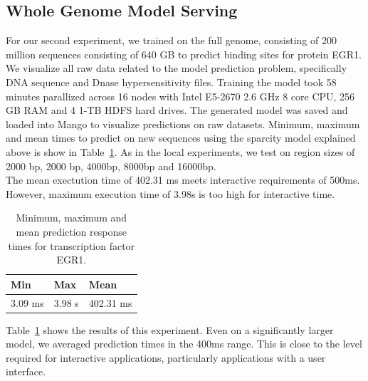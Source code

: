 \documentclass{sig-alternate-05-2015}
\begin{document}
\subsection{Whole Genome Model Serving}
For our second experiment, we trained on the full genome, consisting of 200 million sequences consisting of 640 GB to predict binding sites for protein EGR1. We visualize all raw data related to the model prediction problem, specifically DNA sequence and Dnase hypersensitivity files. Training the model took 58 minutes parallized across 16 nodes with Intel E5-2670 2.6 GHz 8 core CPU, 256 GB RAM and 4 1-TB HDFS hard drives. The generated model was saved and loaded into Mango to visualize predictions on raw datasets. Minimum, maximum and mean times to predict on new sequences using the sparcity model explained above is show in Table~\ref{table:fullGenome}. As in the local experiments, we test on region sizes of 2000 bp, 2000 bp, 4000bp, 8000bp and 16000bp. \\

The mean exectution time of 402.31 ms meets interactive requirements of 500ms. However, maximum execution time of 3.98s is too high for interactive time.

\begin{table}
\centering
\caption{Minimum, maximum and mean prediction response times for transcription factor EGR1.}
\label{table:fullGenome}
\begin{tabular}{|l|l|l|}
\hline
\textbf{Min} & \textbf{Max} & \textbf{Mean} \\ \hline
3.09 ms & 3.98 s & 402.31 ms  \\ \hline
\end{tabular}
\end{table}

Table~\ref{table:fullGenome} shows the results of this experiment. Even on a significantly larger model, we averaged prediction times in the 400ms range. This is close to the level required for interactive applications, particularly applications with a user interface.
\end{document}
